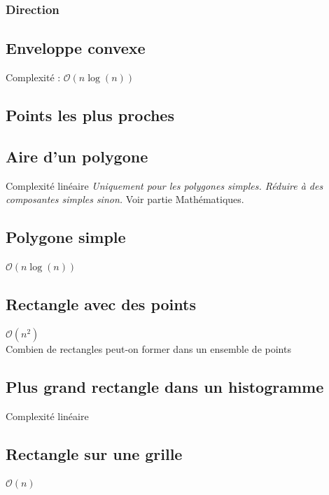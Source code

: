 \documentclass[8pt]{article}
\begin{document}
            \subsubsection{Direction}
            {\scriptsize}
        \subsection{Enveloppe convexe}
            Complexité : $\mathcal{O}(n \log(n))$
            {\scriptsize}
        \subsection{Points les plus proches}
            {\scriptsize}
        \subsection{Aire d'un polygone}
        Complexité linéaire
        \textit{Uniquement pour les polygones simples. Réduire à des composantes simples sinon.}
        Voir partie Mathématiques.
        {\scriptsize}
        \subsection{Polygone simple}
        $\mathcal{O}(n\log(n))$
        {\scriptsize}
        \subsection{Rectangle avec des points}
        $\mathcal{O}(n^2)$\\
        Combien de rectangles peut-on former dans un ensemble de points
        {\scriptsize}
        \subsection{Plus grand rectangle dans un histogramme}
        Complexité linéaire
        {\scriptsize}
        \subsection{Rectangle sur une grille}
        $\mathcal{O}(n)$
        {\scriptsize}
\end{document}
